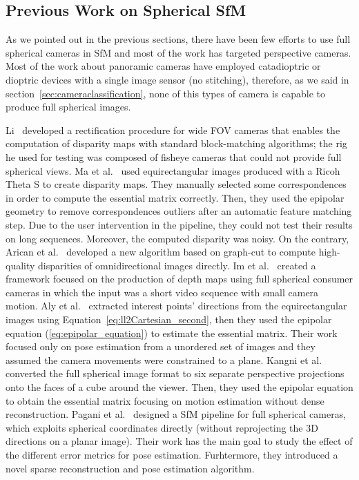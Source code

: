 \subsection{Previous Work on Spherical SfM}
\label{subsec:related_work}
As we pointed out in the previous sections, there have been few efforts to use 
full spherical cameras in SfM and most of the work
has targeted perspective cameras.
Most of the work about panoramic cameras have employed catadioptric or dioptric 
devices with a single image sensor (no stitching), therefore, as we said in 
section~\ref{sec:cameraclassification}, none of this types of camera is capable
to produce full spherical images.

Li~\cite{li2008binocular,li2006real} developed a rectification procedure for wide
FOV cameras that enables the computation of disparity maps with standard 
block-matching algorithms; the rig he used for testing was composed of 
fisheye cameras that could not provide full spherical views.
%
Ma et al.~\cite{ma20153d} used equirectangular images produced with a 
Ricoh Theta S to create disparity maps. They manually selected some 
correspondences in order to compute the essential matrix correctly. Then, they 
used the epipolar geometry to remove correspondences outliers after an 
automatic feature matching step. Due to the user intervention in 
the pipeline, they could not test their results on long sequences. Moreover, the
computed disparity was noisy.
%
On the contrary, Arican et al.~\cite{arican2007dense} developed a new algorithm
based on graph-cut to compute high-quality disparities of omnidirectional images directly.
%
Im et al.~\cite{im2016all} created a framework focused on the production of depth maps using full spherical consumer cameras in which the input was a short video sequence with small camera motion.
%
Aly et al.~\cite{aly2012street} extracted interest points' directions from the
equirectangular images using Equation~\ref{eq:ll2Cartesian_second}, then they used the 
epipolar equation (\ref{eq:epipolar_equation}) to estimate the essential matrix.
Their work focused only on pose estimation from a unordered set of images
and they assumed the camera movements were constrained to a plane.
%
Kangni et al.~\cite{kangni2007orientation} converted the full spherical image format to six 
separate perspective projections onto the faces of a cube around the viewer. 
Then, they used the epipolar equation to obtain the essential matrix focusing on motion estimation without dense reconstruction.
Pagani et al.~\cite{pagani2011structure} designed a SfM pipeline for full
spherical cameras, which exploits spherical coordinates directly (without 
reprojecting the 3D directions on a planar image). Their work has the main
goal to study the effect of the different error metrics for pose estimation.
Furhtermore, they introduced a novel sparse reconstruction and pose estimation algorithm.

